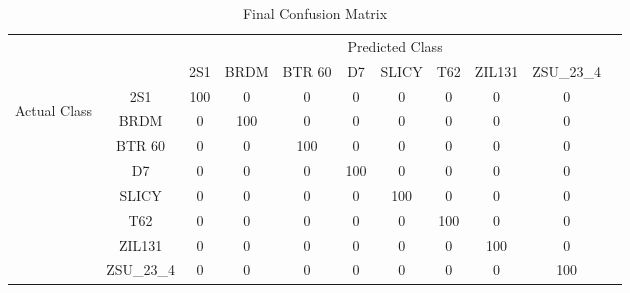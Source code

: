 \begin{table}
	\centering
	\begin{tabular}{|*{11}{c|}}
		
		\cline{3-10}
		\multicolumn{2}{c|}{}         & \multicolumn{8}{|c|}{Predicted Class} 			\\ \cline{3-10}
		\multicolumn{2}{c|}{}                  & 2S1 & BRDM & BTR 60 & D7 & SLICY & T62 & ZIL131 & ZSU\_23\_4 \\ \hline
		\multirow{8}{*}{\begin{turn}{90}Actual Class\end{turn}}
		& 2S1        & 100 & 0 & 0 & 0 & 0 & 0 & 0 & 0 	\\ \cline{2-10}
		& BRDM       & 0 & 100 & 0 & 0 & 0 & 0 & 0 & 0 	\\ \cline{2-10}
		& BTR 60     & 0 & 0 & 100 & 0 & 0 & 0 & 0 & 0 	\\ \cline{2-10}
		& D7 	     & 0 & 0 & 0 & 100 & 0 & 0 & 0 & 0 	\\ \cline{2-10}
		& SLICY      & 0 & 0 & 0 & 0 & 100 & 0 & 0 & 0 	\\ \cline{2-10}
		& T62        & 0 & 0 & 0 & 0 & 0 & 100 & 0 & 0 	\\ \cline{2-10}
		& ZIL131 	 & 0 & 0 & 0 & 0 & 0 & 0 & 100 & 0 	\\ \cline{2-10}
		& ZSU\_23\_4 & 0 & 0 & 0 & 0 & 0 & 0 & 0 & 100 	\\ \cline{2-10} 
		\hline	\end{tabular}
	\label{tab:final_conf}
	\caption{Final Confusion Matrix}
	\centering
\end{table}

